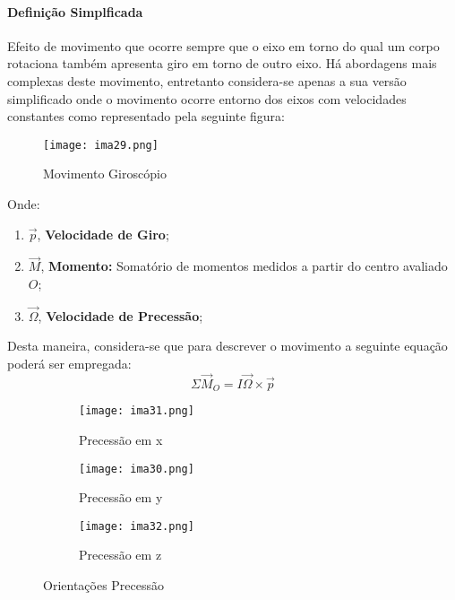 \documentclass{article}
\begin{document}
            \paragraph{Definição Simplficada}Efeito de movimento que ocorre sempre que o eixo em torno do qual um corpo rotaciona também apresenta giro em torno de outro eixo. Há abordagens mais complexas deste movimento, entretanto considera-se apenas a sua versão simplificado onde o movimento ocorre entorno dos eixos com velocidades constantes como representado pela seguinte figura:
                \begin{figure}[H]
                    \centering
                    \texttt{[image: ima29.png]}
                    \caption{Movimento Giroscópio}
                \end{figure}\noindent
            Onde:
                \begin{enumerate}[rightmargin = \leftmargin, noitemsep]
                    \item $\vec{p}$, \textbf{Velocidade de Giro};
                    \item $\vec{M}$, \textbf{Momento:} Somatório de momentos medidos a partir do centro avaliado $O$;
                    \item $\vec{\Omega}$, \textbf{Velocidade de Precessão};
                \end{enumerate}
            Desta maneira, considera-se que para descrever o movimento a seguinte equação poderá ser empregada:
                \begin{equation}
                    \boxed{
                        \Sigma\vec{M}_{O} = I \vec{\Omega}\times\vec{p}
                    }
                \end{equation}
                \begin{figure}[H]
                    \centering
                    \begin{subfigure}[t]{0.3\linewidth}
                        \centering
                        \texttt{[image: ima31.png]}
                        \caption{Precessão em x}
                    \end{subfigure}
                    \begin{subfigure}[t]{0.3\linewidth}
                        \centering
                        \texttt{[image: ima30.png]}
                        \caption{Precessão em y}
                    \end{subfigure}
                    \begin{subfigure}[t]{0.3\linewidth}
                        \centering
                        \texttt{[image: ima32.png]}
                        \caption{Precessão em z}
                    \end{subfigure}
                    \caption{Orientações Precessão}
                \end{figure}
\end{document}

